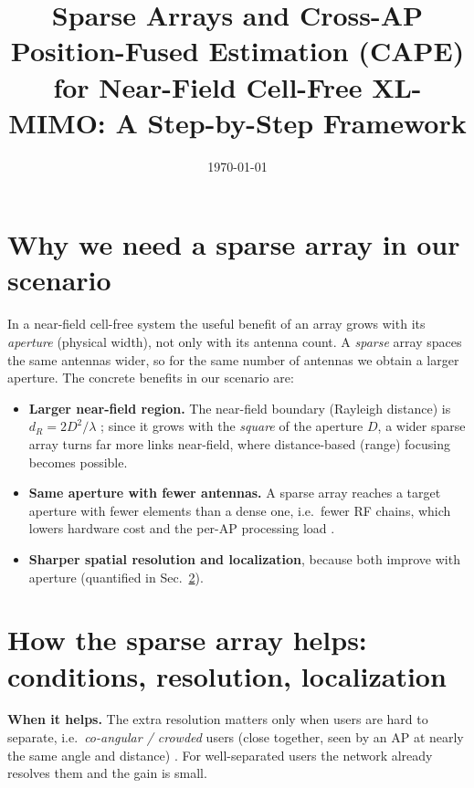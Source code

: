 \documentclass[11pt]{article}
\title{\textbf{Sparse Arrays and Cross-AP Position-Fused Estimation (CAPE)\\for Near-Field Cell-Free XL-MIMO: A Step-by-Step Framework}}
\date{\today}
\begin{document}
\maketitle
\newcommand{\vexp}[2]{\par\smallskip\noindent where #1}

\section{Why we need a sparse array in our scenario}
In a near-field cell-free system the useful benefit of an array grows with its \emph{aperture}
(physical width), not only with its antenna count. A \emph{sparse} array spaces the same antennas
wider, so for the same number of antennas we obtain a larger aperture. The concrete benefits in our
scenario are:
\begin{itemize}[leftmargin=1.4em,itemsep=1pt]
\item \textbf{Larger near-field region.} The near-field boundary (Rayleigh distance) is
      $d_{R}=2D^{2}/\lambda$ \cite{lu2024tutorial,bjornson2021primer}; since it grows with the
      \emph{square} of the aperture $D$, a wider sparse array turns far more links near-field, where
      distance-based (range) focusing becomes possible.
\item \textbf{Same aperture with fewer antennas.} A sparse array reaches a target aperture with
      fewer elements than a dense one, i.e.\ fewer RF chains, which lowers hardware cost and the
      per-AP processing load \cite{wang2024xltutorial,zhou2025sparse}.
\item \textbf{Sharper spatial resolution and localization}, because both improve with aperture
      \cite{zhou2025sparse,chen2024nearfield} (quantified in Sec.~\ref{sec:res}).
\end{itemize}

\section{How the sparse array helps: conditions, resolution, localization}\label{sec:res}
\textbf{When it helps.} The extra resolution matters only when users are hard to separate, i.e.\
\emph{co-angular / crowded} users (close together, seen by an AP at nearly the same angle and
distance) \cite{chen2024nearfield}. For well-separated users the network already resolves them and
the gain is small.
\end{document}

